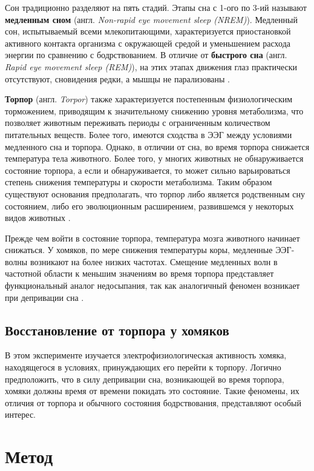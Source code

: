 \documentclass[12pt,a4paper,oneside]{article}
\begin{document}
Сон традиционно разделяют на пять стадий. Этапы сна с 1-ого по 3-ий называют \textbf{медленным сном} (англ. \textit{Non-rapid eye movement sleep (NREM)}). Медленный сон, испытываемый всеми млекопитающими, характеризуется приостановкой активного контакта организма с окружающей средой и уменьшением расхода энергии по сравнению с бодрствованием. В отличие от \textbf{быстрого сна} (англ. \textit{Rapid eye movement sleep (REM)}), на этих этапах движения глаз практически отсутствуют, сновидения редки, а мышцы не парализованы \cite{McCarley2007}. 

\textbf{Торпор} (англ. \textit{Torpor}) также характеризуется постепенным физиологическим торможением, приводящим к значительному снижению уровня метаболизма, что позволяет животным переживать периоды с ограниченным количеством питательных веществ. Более того, имеются сходства в ЭЭГ между условиями медленного сна и торпора. Однако, в отличии от сна, во время торпора снижается температура тела животного. Более того, у многих животных не обнаруживается состояние торпора, а если и обнаруживается, то может сильно варьироваться степень снижения температуры и скорости метаболизма. Таким образом существуют основания предполагать, что торпор либо является родственным сну состоянием, либо его эволюционным расширением, развившемся у некоторых видов животных \cite{Silvani2018}. 

Прежде чем войти в состояние торпора, температура мозга животного начинает снижаться. У хомяков, по мере снижения температуры коры, медленные ЭЭГ-волны возникают на более низких частотах. Смещение медленных волн в частотной области к меньшим значениям во время торпора представляет функциональный аналог недосыпания, так как аналогичный феномен возникает при депривации сна \cite{Silvani2018}.

\subsection{Восстановление от торпора у хомяков}

В этом эксперименте изучается электрофизиологическая активность хомяка, находящегося в условиях, принуждающих его перейти к торпору. Логично предположить, что в силу депривации сна, возникающей во время торпора, хомяки должны время от времени покидать это состояние. Такие феномены, их отличия от торпора и обычного состояния бодрствования, представляют особый интерес.

\section{Метод} %
\end{document}
